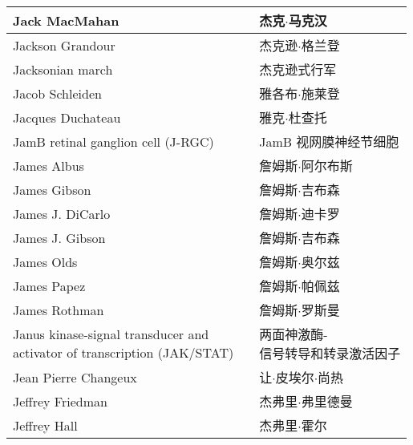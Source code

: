 \begin{longtable}{lll}
	\midrule
	Jack MacMahan   && 杰克$\cdot$马克汉  \\
	
	\midrule
	Jackson Grandour   && 杰克逊$\cdot$格兰登  \\
	
	\midrule
	Jacksonian march   && 杰克逊式行军  \\
	
	\midrule
	Jacob Schleiden   && 雅各布$\cdot$施莱登  \\
	
	\midrule
	Jacques Duchateau   && 雅克$\cdot$杜查托  \\
	
	\midrule
	JamB retinal ganglion cell (J-RGC)   && JamB 视网膜神经节细胞  \\
	
	\midrule
	James Albus   && 詹姆斯$\cdot$阿尔布斯  \\
	
	\midrule
	James Gibson   && 詹姆斯$\cdot$吉布森  \\
	
	\midrule
	James J. DiCarlo   && 詹姆斯$\cdot$迪卡罗  \\
	
	\midrule
	James J. Gibson   && 詹姆斯$\cdot$吉布森  \\
	
	\midrule
	James Olds   && 詹姆斯$\cdot$奥尔兹  \\
	
	\midrule
	James Papez   && 詹姆斯$\cdot$帕佩兹  \\
	
	\midrule
	James Rothman   && 詹姆斯$\cdot$罗斯曼  \\
	
	\midrule
	\makecell[l]{Janus kinase-signal transducer and \\activator of transcription (JAK/STAT)}  && \makecell[l]{两面神激酶-\\信号转导和转录激活因子}  \\
	
	\midrule
	Jean Pierre Changeux   && 让$\cdot$皮埃尔$\cdot$尚热  \\
	
	\midrule
	Jeffrey Friedman   && 杰弗里$\cdot$弗里德曼  \\
	
	\midrule
	Jeffrey Hall   && 杰弗里$\cdot$霍尔  \\
	

\end{longtable}
